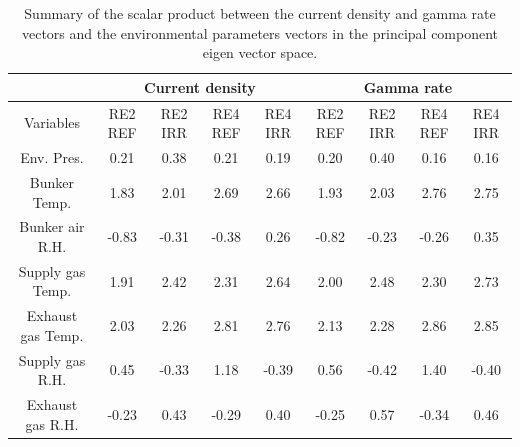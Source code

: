 	\begin{table}[H]
		\centering
		\scriptsize
		\begin{tabular}{|*{9}{c|}}
			\cline{2-9}
			\multicolumn{1}{c|}{} & \multicolumn{4}{c|}{Current density}  & \multicolumn{4}{c|}{Gamma rate}      \\
			\hline
			Variables             & RE2 REF & RE2 IRR & RE4 REF & RE4 IRR & RE2 REF & RE2 IRR & RE4 REF & RE4 IRR\\
			\hline
			Env. Pres.            &  0.21   &  0.38   &  0.21   &  0.19   &  0.20   &  0.40   &  0.16   &  0.16  \\
			\hline
			Bunker Temp.          &  1.83   &  2.01   &  2.69   &  2.66   &  1.93   &  2.03   &  2.76   &  2.75  \\
			\hline
			Bunker air R.H.       & -0.83   & -0.31   & -0.38   &  0.26   & -0.82   & -0.23   & -0.26   &  0.35  \\
			\hline
			Supply gas Temp.      &  1.91   &  2.42   &  2.31   &  2.64   &  2.00   &  2.48   &  2.30   &  2.73  \\
			\hline
			Exhaust gas Temp.     &  2.03   &  2.26   &  2.81   &  2.76   &  2.13   &  2.28   &  2.86   &  2.85  \\
			\hline
			Supply gas R.H.       &  0.45   & -0.33   &  1.18   & -0.39   &  0.56   & -0.42   &  1.40   & -0.40  \\
			\hline
			Exhaust gas R.H.      & -0.23   &  0.43   & -0.29   &  0.40   & -0.25   &  0.57   & -0.34   &  0.46  \\
			\hline
		\end{tabular}
		\caption{\label{tab:Scalar-FullData} Summary of the scalar product between the current density and gamma rate vectors and the environmental parameters vectors in the principal component eigen vector space.}
	\end{table}

\normalsize
	
